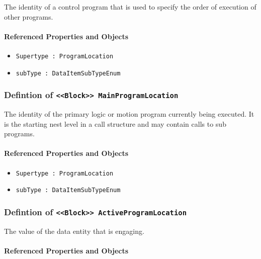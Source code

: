 \FloatBarrier

The identity of a control program that is used to specify the order of execution of other programs.

\FloatBarrier
\paragraph{Referenced Properties and Objects}

\begin{itemize}
\item \texttt{Supertype : ProgramLocation}

\item \texttt{subType : DataItemSubTypeEnum}

\end{itemize}
\FloatBarrier
\subsubsection{Defintion of \texttt{<<Block>> MainProgramLocation}}
  \label{type:MainProgramLocation}

\FloatBarrier

The identity of the primary logic or motion program currently being executed. It is the starting nest level in a call structure and may contain calls to sub programs.

\FloatBarrier
\paragraph{Referenced Properties and Objects}

\begin{itemize}
\item \texttt{Supertype : ProgramLocation}

\item \texttt{subType : DataItemSubTypeEnum}

\end{itemize}
\FloatBarrier
\subsubsection{Defintion of \texttt{<<Block>> ActiveProgramLocation}}
  \label{type:ActiveProgramLocation}

\FloatBarrier

The value of the data entity that is engaging.

\FloatBarrier
\paragraph{Referenced Properties and Objects}

